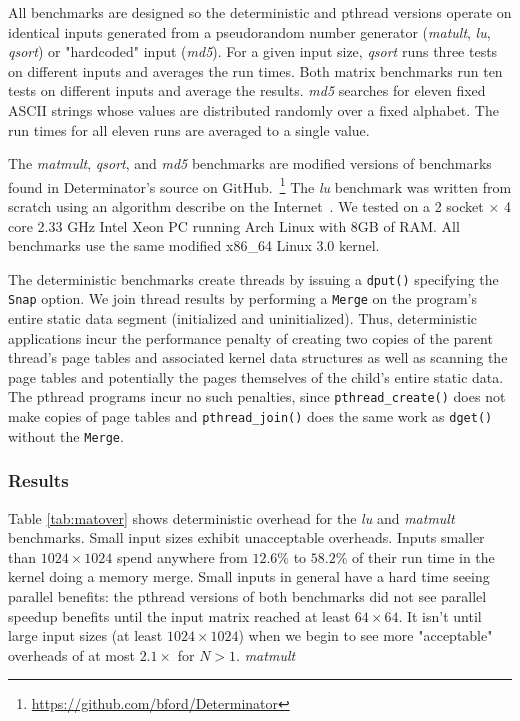 All benchmarks are designed so the deterministic and pthread versions operate on
identical inputs generated from a pseudorandom number generator (\emph{matult},
\emph{lu}, \emph{qsort}) or "hardcoded" input (\emph{md5}).
For a given input size, \emph{qsort} runs three tests on different inputs and
averages the run times. Both matrix benchmarks run ten tests on different inputs
and average the results. \emph{md5} searches for eleven fixed ASCII strings
whose values are distributed randomly over a fixed alphabet. The run times for
all eleven runs are averaged to a single value.

The \emph{matmult}, \emph{qsort}, and \emph{md5} benchmarks are modified
versions of benchmarks found in Determinator's source on
GitHub.~\footnote{\url{https://github.com/bford/Determinator}}
The \emph{lu} benchmark was written from scratch using an algorithm describe
on the Internet~\cite{lualg}. We tested on a 2 socket $\times$ 4 core 2.33 GHz
Intel Xeon PC running Arch Linux with 8GB of RAM. All benchmarks use the same
modified \mbox{x86\_64} Linux 3.0 kernel.

The deterministic benchmarks create threads by issuing a {\tt dput()} specifying
the {\tt Snap} option. We join thread results by performing a {\tt Merge} on the
program's entire static data segment (initialized and uninitialized). Thus,
deterministic applications incur the performance penalty of creating two copies
of the parent thread's page tables and associated kernel data structures
as well as scanning the page tables and potentially the pages
themselves of the child's entire static data. The pthread programs incur no
such penalties, since \mbox{{\tt pthread\_create()}} does not make copies of
page tables and \mbox{{\tt pthread\_join()}} does the same work as {\tt dget()}
without the {\tt Merge}.

\subsubsection{Results}
Table \ref{tab:matover} shows deterministic overhead for the \emph{lu} and
\emph{matmult} benchmarks. Small input sizes exhibit unacceptable overheads.
Inputs smaller than $1024\times 1024$ spend anywhere from $12.6\%$ to $58.2\%$
of their run time in the kernel doing a memory merge.
Small inputs in general have a hard time seeing parallel benefits: the pthread
versions of both benchmarks did not see parallel speedup benefits until the
input matrix reached at least $64\times 64$. 
It isn't until large input sizes (at least $1024\times 1024$) when we begin to
see more "acceptable" overheads of at most $2.1\times$ for $N>1$.
\emph{matmult} 

